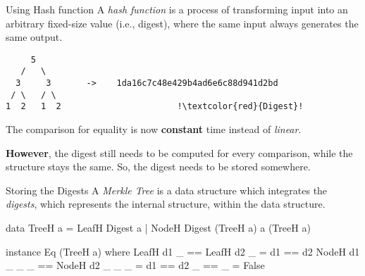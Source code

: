 \begin{slide}{Using Hash function}
A \textit{hash function} is a process of transforming input into an arbitrary fixed-size value (i.e., digest), where the same input always generates the same output.

\begin{center}
\begin{verbatim}
     5 
   /   \
  3     3       ->    1da16c7c48e429b4ad6e6c88d941d2bd
 / \   / \    
1  2   1  2                       !\textcolor{red}{Digest}!  
\end{verbatim}
\end{center}

\vspace*{0.4cm}
The comparison for equality is now \textbf{constant} time instead of \textit{linear}.

\textbf{However}, the digest still needs to be computed for every comparison, while the structure stays the same. So, the digest needs to be stored somewhere. 
\end{slide}



\begin{slide}{Storing the Digests}
A \textit{Merkle Tree} is a data structure which integrates the \textit{digests}, which represents the internal structure, within the data structure.

\vspace*{0.4cm}
\begin{haskell}
data TreeH a = LeafH Digest a
             | NodeH Digest (TreeH a) a (TreeH a)


instance Eq (TreeH a) where
  LeafH d1 _     == LeafH d2 _     = d1 == d2
  NodeH d1 _ _ _ == NodeH d2 _ _ _ = d1 == d2
  _              == _              = False
\end{haskell}
\end{slide}

